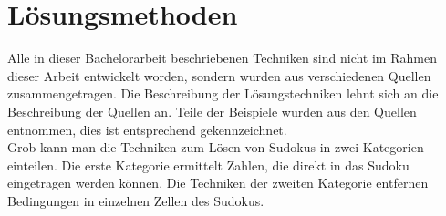 \newpage
\section{Lösungsmethoden}
\label{Methoden}
Alle in dieser Bachelorarbeit beschriebenen Techniken sind nicht im Rahmen dieser Arbeit entwickelt worden, sondern wurden aus verschiedenen Quellen zusammengetragen. Die Beschreibung der Lösungstechniken lehnt sich an die Beschreibung der Quellen an. Teile der Beispiele wurden aus den Quellen entnommen, dies ist entsprechend gekennzeichnet.\\
Grob kann man die Techniken zum Lösen von Sudokus in zwei Kategorien einteilen. Die erste Kategorie ermittelt Zahlen, die direkt in das Sudoku eingetragen werden können. Die Techniken der zweiten Kategorie entfernen Bedingungen in einzelnen Zellen des Sudokus.